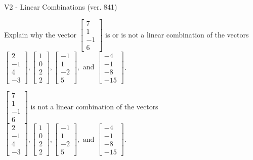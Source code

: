 \begin{exercise}
  \begin{exerciseTitle}V2 - Linear Combinations (ver. 841)\end{exerciseTitle}
  \begin{exerciseStatement}
    Explain why the vector \(\left[\begin{array}{c}
7 \\
1 \\
-1 \\
6
\end{array}\right]\)  is or is not a linear 
	combination of the vectors \(\left[\begin{array}{c}
2 \\
-1 \\
4 \\
-3
\end{array}\right] , \left[\begin{array}{c}
1 \\
0 \\
2 \\
2
\end{array}\right] , \left[\begin{array}{c}
-1 \\
1 \\
-2 \\
5
\end{array}\right] , \text{ and } \left[\begin{array}{c}
-4 \\
-1 \\
-8 \\
-15
\end{array}\right]\).
	


  \end{exerciseStatement}
  \begin{exerciseAnswer}
   \(\left[\begin{array}{c}
7 \\
1 \\
-1 \\
6
\end{array}\right]\) 
  	 is not  
	a linear combination of the vectors \(\left[\begin{array}{c}
2 \\
-1 \\
4 \\
-3
\end{array}\right] , \left[\begin{array}{c}
1 \\
0 \\
2 \\
2
\end{array}\right] , \left[\begin{array}{c}
-1 \\
1 \\
-2 \\
5
\end{array}\right] , \text{ and } \left[\begin{array}{c}
-4 \\
-1 \\
-8 \\
-15
\end{array}\right]\).


\end{exerciseAnswer}
\end{exercise}
